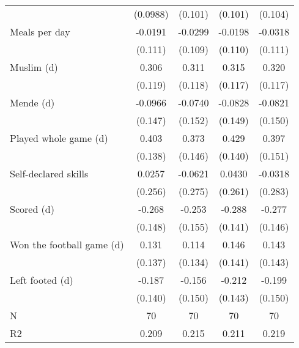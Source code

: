{\begin{tabular}{l*{4}{c}}
                    &    (0.0988)         &     (0.101)         &     (0.101)         &     (0.104)         \\
[1em]
Meals per day       &     -0.0191         &     -0.0299         &     -0.0198         &     -0.0318         \\
                    &     (0.111)         &     (0.109)         &     (0.110)         &     (0.111)         \\
[1em]
Muslim (d)          &       0.306\sym{**} &       0.311\sym{***}&       0.315\sym{***}&       0.320\sym{***}\\
                    &     (0.119)         &     (0.118)         &     (0.117)         &     (0.117)         \\
[1em]
Mende (d)           &     -0.0966         &     -0.0740         &     -0.0828         &     -0.0821         \\
                    &     (0.147)         &     (0.152)         &     (0.149)         &     (0.150)         \\
[1em]
Played whole game (d)&       0.403\sym{***}&       0.373\sym{**} &       0.429\sym{***}&       0.397\sym{***}\\
                    &     (0.138)         &     (0.146)         &     (0.140)         &     (0.151)         \\
[1em]
Self-declared skills&      0.0257         &     -0.0621         &      0.0430         &     -0.0318         \\
                    &     (0.256)         &     (0.275)         &     (0.261)         &     (0.283)         \\
[1em]
Scored (d)          &      -0.268\sym{*}  &      -0.253         &      -0.288\sym{**} &      -0.277\sym{*}  \\
                    &     (0.148)         &     (0.155)         &     (0.141)         &     (0.146)         \\
[1em]
Won the football game (d)&       0.131         &       0.114         &       0.146         &       0.143         \\
                    &     (0.137)         &     (0.134)         &     (0.141)         &     (0.143)         \\
[1em]
Left footed (d)     &      -0.187         &      -0.156         &      -0.212         &      -0.199         \\
                    &     (0.140)         &     (0.150)         &     (0.143)         &     (0.150)         \\
\hline
N                   &          70         &          70         &          70         &          70         \\
R2                  &       0.209         &       0.215         &       0.211         &       0.219         \\
\hline\hline
\end{tabular}
}
